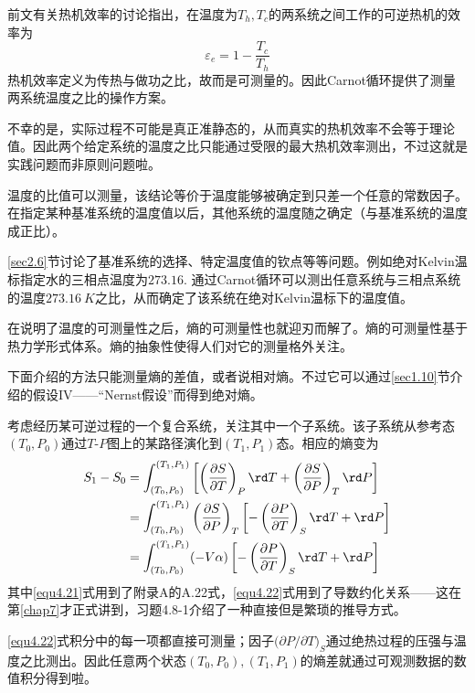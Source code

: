 前文有关热机效率的讨论指出，在温度为$T_h, T_c$的两系统之间工作的可逆热机的效率为
\begin{equation}
	\varepsilon_e = 1 - \frac{T_c}{T_h}
\label{equ4.19}
\end{equation}
热机效率定义为传热与做功之比，故而是可测量的。因此Carnot循环提供了测量两系统温度之比的操作方案。

不幸的是，实际过程不可能是真正准静态的，从而真实的热机效率不会等于理论值。因此两个给定系统的温度之比只能通过受限的最大热机效率测出，不过这就是实践问题而非原则问题啦。

温度的比值可以测量，该结论等价于温度能够被确定到只差一个任意的常数因子。在指定某种基准系统的温度值以后，其他系统的温度随之确定（与基准系统的温度成正比）。

\ref{sec2.6}节讨论了基准系统的选择、特定温度值的钦点等等问题。例如绝对Kelvin温标指定水的三相点温度为$273.16$. 通过Carnot循环可以测出任意系统与三相点系统的温度$\SI{273.16}{K}$之比，从而确定了该系统在绝对Kelvin温标下的温度值。

在说明了温度的可测量性之后，熵的可测量性也就迎刃而解了。熵的可测量性基于热力学形式体系。熵的抽象性使得人们对它的测量格外关注。

下面介绍的方法只能测量熵的差值，或者说相对熵。不过它可以通过\ref{sec1.10}节介绍的假设IV——“Nernst假设”而得到绝对熵。

考虑经历某可逆过程的一个复合系统，关注其中一个子系统。该子系统从参考态$(T_0, P_0)$通过$T\text{-}P$图上的某路径演化到$(T_1, P_1)$态。相应的熵变为
\begin{align}
	S_1 - S_0 &= \int_{ (T_0, P_0) }^{ (T_1, P_1) } \left[ \left( \frac{\partial S}{\partial T} \right)_P \rd T + \left( \frac{\partial S}{\partial P} \right)_T \rd P \right] \label{equ4.20} \\
	&= \int_{ (T_0, P_0) }^{ (T_1, P_1) } \left( \frac{\partial S}{\partial P} \right)_T \left[ -\left( \frac{\partial P}{\partial T} \right)_S \rd T + \rd P \right] \label{equ4.21} \\
	&= \int_{ (T_0, P_0) }^{ (T_1, P_1) } (-V\alpha) \left[ -\left( \frac{\partial P}{\partial T} \right)_S \rd T + \rd P \right] \label{equ4.22}
\end{align}
其中\eqref{equ4.21}式用到了附录A的A.22式，\eqref{equ4.22}式用到了导数约化关系——这在第\ref{chap7}才正式讲到，习题4.8-1介绍了一种直接但是繁琐的推导方式。

\eqref{equ4.22}式积分中的每一项都直接可测量；因子$\big( \partial P / \partial T \big)_S$通过绝热过程的压强与温度之比测出。因此任意两个状态$(T_0, P_0), (T_1, P_1)$的熵差就通过可观测数据的数值积分得到啦。

